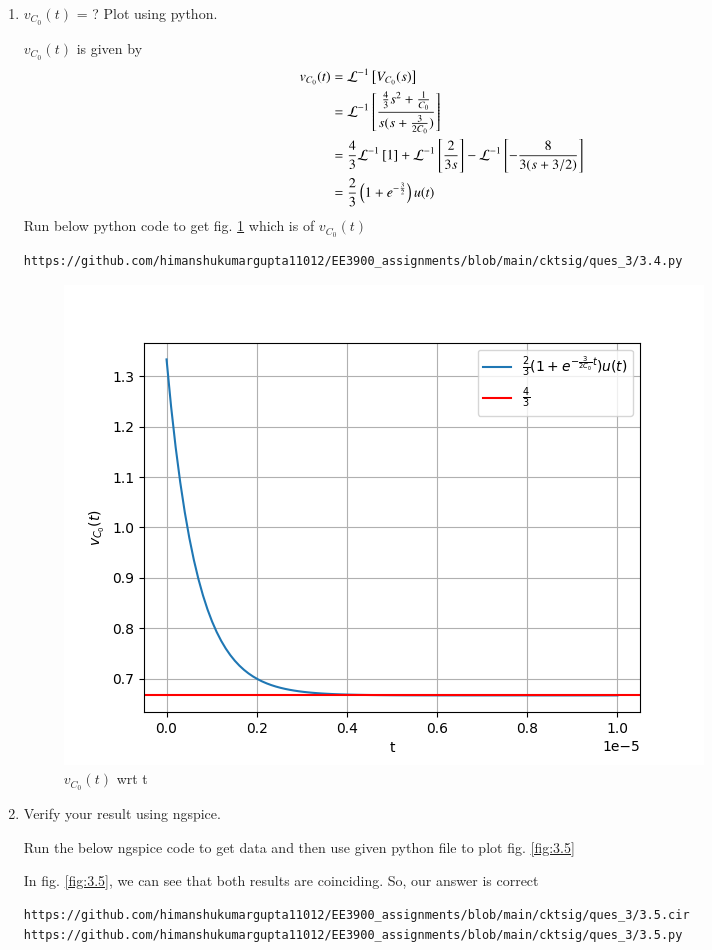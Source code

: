 \documentclass[journal,12pt,twocolumn]{IEEEtran}
\renewcommand\thesection{\arabic{section}}
\begin{document}
\begin{enumerate}[label=\arabic*.,ref=\thesection.\theenumi]
	\item $v_{C_0}(t)$ = ? Plot using python.

		\solution 
 $v_{C_0}(t)$ is given by
			\begin{align}
				v_{C_0}(t)&=\mathcal{L}^{-1}{}\left[V_{C_0}(s)\right]\\
				&=\mathcal{L}^{-1}{}\left[\frac{\frac{4}{3}s^2+\frac{1}{C_0}}{s(s+\frac{3}{2C_0})}\right]\\
				&=\frac{4}{3}\mathcal{L}^{-1}{}\left[1\right]+\mathcal{L}^{-1}{}\left[\frac{2}{3s}\right]-\mathcal{L}^{-1}{}\left[-\frac{8}{3(s+3/2)}\right]\\
				&=\frac{2}{3}\left(1+e^{-\frac{3}{2}}\right)u(t)
				\end{align}
				Run below python code to get fig. \ref{fig:3.4} which is of $v_{C_0}(t)$
\begin{lstlisting}
https://github.com/himanshukumargupta11012/EE3900_assignments/blob/main/cktsig/ques_3/3.4.py
		\end{lstlisting}
\begin{figure}[!ht]
	\centering
	\includegraphics[width=\columnwidth]{./ques_3/3.4.png}
	\caption{$v_{C_0}(t)$ wrt t}	
	\label{fig:3.4}
\end{figure}


	\item Verify your result using ngspice.

\solution Run the below ngspice code to get data and then use given python file to plot fig. \ref{fig:3.5}

		In fig. \ref{fig:3.5}, we can see that both results are coinciding. So, our answer is correct
\begin{lstlisting}
https://github.com/himanshukumargupta11012/EE3900_assignments/blob/main/cktsig/ques_3/3.5.cir
https://github.com/himanshukumargupta11012/EE3900_assignments/blob/main/cktsig/ques_3/3.5.py
		\end{lstlisting}


\end{enumerate}
\end{document}

